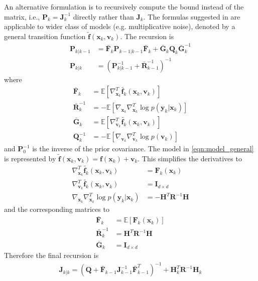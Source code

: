 \documentclass{article}
\renewcommand{\vec}[1]{\ensuremath{{\boldsymbol #1}}}
\newcommand{\mat}[1]{\ensuremath{\boldsymbol{#1}}}
\begin{document}
An alternative formulation is to recursively compute the bound instead of the matrix, i.e., $\mat P_k = \mat J_k^{-1}$ directly rather than $\mat J_k$. The formulas suggested in \cite{Bergman2001} are applicable to wider class of models (e.g. multiplicative noise), denoted by a general transition function $\tilde{\vec f}(\vec x_k,\vec v_k)$. The recursion is
\begin{subequations}
\begin{align}
	\mat P_{k|k-1} &= \bar{\mat F}_k\mat P_{k-1|k-1}\bar{\mat F}_k + \bar{\mat G}_k\mat Q_k \bar{\mat G}_k^{-1} \\
		\mat P_{k|k} &= \left(\mat P_{k|k-1}^{-1} + \bar{\mat R}_{k-1}^{-1}\right)^{-1}
\end{align}
\end{subequations}
where
\begin{align}
	\bar{\mat F}_k &= \mathbb E \left[ \nabla_{\vec x_k}^T \tilde{\vec f_k}(\vec x_k,\vec v_k)\right] \\
	\bar{\mat R}_k^{-1} &= -\mathbb E\left[ \nabla_{\vec x_k}\nabla_{\vec x_k}^T \log p(\vec y_k|\vec x_k) \right] \\
	\bar{\mat G}_k &= \mathbb E \left[ \nabla_{\vec v_k}^T \tilde{\vec f_k}(\vec x_k,\vec v_k)\right] \\
	\mat Q_k^{-1} &= -\mathbb E \left[ \nabla_{\vec v_k}\nabla_{\vec v_k}^T \log p(\vec v_k) \right]
\end{align}
and $\mat P_0^{-1}$ is the inverse of the prior covariance. The model in \eqref{eqn:model_general} is represented by $\tilde{\vec f}(\vec x_k,\vec v_k) = \vec f(\vec x_k) + \vec v_k$. This simplifies the derivatives to
\begin{align}
	\nabla_{\vec x_k}^T \tilde{\vec f_k}(\vec x_k,\vec v_k) &= \mat F_k(\vec x_k) \\
	\nabla_{\vec v_k}^T \tilde{\vec f_k}(\vec x_k,\vec v_k) &= \mat I_{d\times d} \\
	\nabla_{\vec x_k}\nabla_{\vec x_k}^T \log p(\vec y_k|\vec x_k) &= -\mat H^T\mat R^{-1} \mat H 
\end{align}
and the corresponding matrices to	
\begin{align}
	\bar{\mat F}_k &= \mathbb E\left[ \mat F_k(\vec x_k)\right] \label{eqn:pcrb_term_F}\\
	\bar{\mat R}_k^{-1} &= \mat H^T\mat R^{-1} \mat H \\
	\bar{\mat G}_k &= \mat I_{d\times d} 
\end{align}
Therefore the final recursion is
\begin{align}
	\mat J_{k|k} = \left( \mat Q + \bar{\mat F}_{k-1} \mat J_{k-1}^{-1} \bar{\mat F}_{k-1}^T\right)^{-1} + \mat H_k^T \mat R^{-1} \mat H_k
\end{align}
\end{document}
